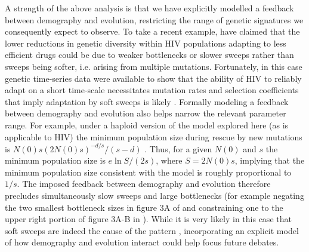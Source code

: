 \documentclass[]{article}
\begin{document}
A strength of the above analysis is that we have explicitly modelled a feedback between demography and evolution, restricting the range of genetic signatures we consequently expect to observe. 
To take a recent example, \cite{harris2018unfounded} have claimed that the lower reductions in genetic diversity within HIV populations adapting to less efficient drugs \citep[as observed by][]{feder2016more} could be due to weaker bottlenecks or slower sweeps rather than sweeps being softer, i.e. arising from multiple mutations. Fortunately, in this case genetic time-series data were available to show that the ability of HIV to reliably adapt on a short time-scale necessitates mutation rates and selection coefficients that imply adaptation by soft sweeps is likely \citep{feder2018clarifying}. 
Formally modeling a feedback between demography and evolution also helps narrow the relevant parameter range.
For example, under a haploid version of the model explored here (as is applicable to HIV) the minimum population size during rescue by new mutations is $N(0) s (2N(0)s)^{-d/s} / (s-d)$ \citep[equation 22 in][]{orr2014population}.
Thus, for a given $N(0)$ and $s$ the minimum population size is $e \ln S / (2s)$, where $S=2N(0)s$, implying that the minimum population size consistent with the model is roughly proportional to $1/s$.
The imposed feedback between demography and evolution therefore precludes simultaneously slow sweeps and large bottlenecks (for example negating the two smallest bottleneck sizes in figure 3A of \citealp{harris2018unfounded} and constraining one to the upper right portion of figure 3A-B in \citealp{feder2018clarifying}).
While it is very likely in this case that soft sweeps are indeed the cause of the pattern \citep{feder2018clarifying}, incorporating an explicit model of how demography and evolution interact could help focus future debates.
\end{document}
